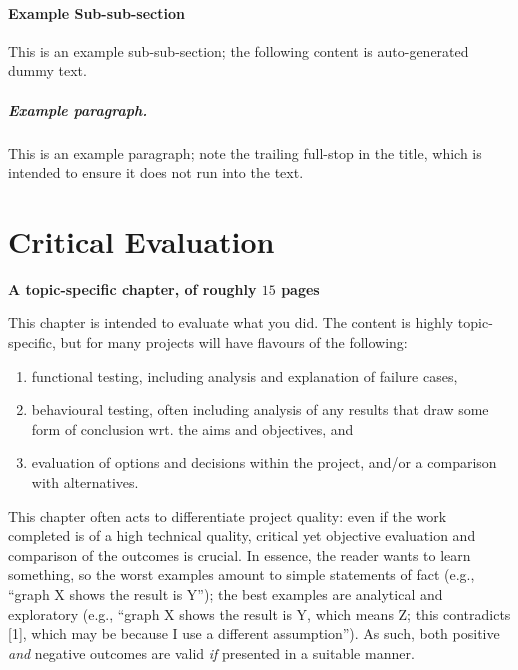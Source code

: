 \documentclass[ %
                    author={Gavin Parker},
                supervisor={Dr. Neill Campbell},
                    degree={MEng},
                     title={Deep Siamese Networks for Illumination Estimation from Stereo Images},
                  subtitle={},
                      type={research},
                      year={2018} ]{dissertation}
\begin{document}
\subsubsection{Example Sub-sub-section}

This is an example sub-sub-section;
the following content is auto-generated dummy text.
\lipsum

\paragraph{Example paragraph.}

This is an example paragraph; note the trailing full-stop in the title,
which is intended to ensure it does not run into the text.


\chapter{Critical Evaluation}
\label{chap:evaluation}

{\bf A topic-specific chapter, of roughly $15$ pages} 
\vspace{1cm} 

\noindent
This chapter is intended to evaluate what you did.  The content is highly 
topic-specific, but for many projects will have flavours of the following:

\begin{enumerate}
\item functional  testing, including analysis and explanation of failure 
      cases,
\item behavioural testing, often including analysis of any results that 
      draw some form of conclusion wrt. the aims and objectives,
      and
\item evaluation of options and decisions within the project, and/or a
      comparison with alternatives.
\end{enumerate}

\noindent
This chapter often acts to differentiate project quality: even if the work
completed is of a high technical quality, critical yet objective evaluation 
and comparison of the outcomes is crucial.  In essence, the reader wants to
learn something, so the worst examples amount to simple statements of fact 
(e.g., ``graph X shows the result is Y''); the best examples are analytical 
and exploratory (e.g., ``graph X shows the result is Y, which means Z; this 
contradicts [1], which may be because I use a different assumption'').  As 
such, both positive {\em and} negative outcomes are valid {\em if} presented 
in a suitable manner.
\end{document}
